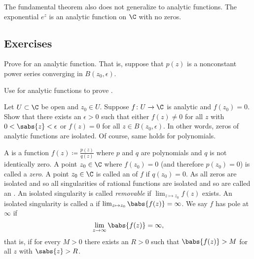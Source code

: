 The fundamental theorem also does not generalize to analytic functions.  The
exponential $e^{z}$ is an analytic function on $\C$ with no zeros.

\subsection{Exercises}

\begin{exercise} \label{exercise:minprinciple}
Prove  for an analytic function.  That
is, suppose that $p(z)$ is a nonconstant power series converging in
$B(z_0,\epsilon)$.
\end{exercise}

\begin{exercise} \label{exercise:maxprinciple}
Use  for analytic functions to prove .
\end{exercise}

\begin{exercise}
Let $U \subset \C$ be open and $z_0 \in U$.
Suppose $f \colon U \to \C$ is analytic and $f(z_0) = 0$.  Show that
there exists an $\epsilon > 0$ such that either
$f(z) \not= 0$ for all $z$ with $0 < \sabs{z} < \epsilon$
or $f(z) = 0$ for all $z \in B(z_0,\epsilon)$.
In other words, zeros of analytic functions are isolated.
Of course, same holds for polynomials.
\end{exercise}

\begin{exnote}
\pagebreak[1]
A \emph{} is a function
$f(z) \coloneqq \frac{p(z)}{q(z)}$
where $p$ and $q$ are polynomials and $q$ is not identically zero.
A point $z_0 \in \C$ where $f(z_0) = 0$ (and therefore $p(z_0) = 0$)
is called a \emph{zero}.
A point $z_0 \in \C$ is called an \emph{} of
$f$ if $q(z_0) = 0$.  As all zeros are isolated and so
all singularities of rational functions are isolated
and so are called
an \emph{}.
An isolated singularity is called
\emph{removable}
if $\lim_{z \mapsto z_0} f(z)$ exists.
An isolated singularity is called a \emph{} if 
$\lim_{z \mapsto z_0} \babs{f(z)} = \infty$.
We say $f$ has pole at $\infty$ if
\begin{equation*}
\lim_{z \to \infty} \babs{f(z)} = \infty ,
\end{equation*}
that is, if for every $M > 0$ there exists an $R > 0$ such that
$\babs{f(z)} > M$ for all $z$ with $\sabs{z} > R$.
\end{exnote}

